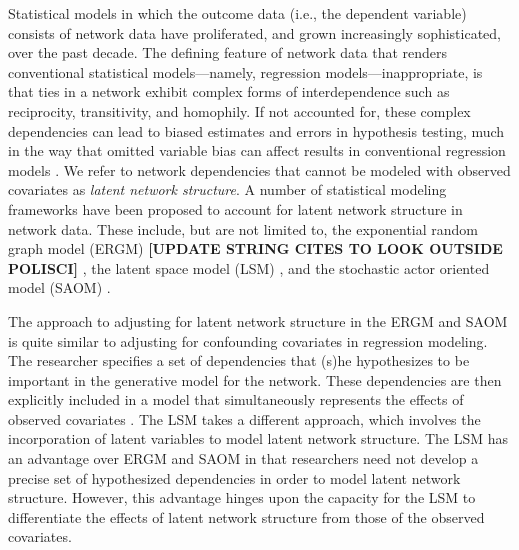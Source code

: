 \documentclass[11pt]{article}
\begin{document}
Statistical models in which the outcome data (i.e., the dependent variable) consists of network data have proliferated, and grown increasingly
sophisticated, over the past decade. The defining feature of network data that renders conventional statistical models---namely, regression models---inappropriate, is that ties in a network exhibit complex forms of interdependence such as reciprocity, transitivity, and
homophily. If not accounted for, these complex dependencies can lead to biased estimates and
errors in hypothesis testing, much in the way that omitted variable
bias can affect results in conventional regression models
\citep{ward2007disputes,kinne2014,cranmerisq,hays2010spatial}.  We refer to network dependencies that cannot be modeled with observed covariates as {\em latent network structure}. A
number of statistical modeling frameworks have been proposed to
account for latent network structure in network data. These include, but are not limited to, the exponential random
graph model (ERGM) {\bf [UPDATE STRING CITES TO LOOK OUTSIDE POLISCI]} \citep[e.g.,
][]{lazer2010,cranmer2011pa,desmarais2012psj}, the latent space model
(LSM) \citep[e.g.,
][]{ward2007disputes,ward2007persistent,kirkland2012multimember}, and
the stochastic actor oriented model (SAOM) \citep[e.g.,
][]{berardo2010ajps,kinne2014}.

The approach to adjusting for latent network structure in the ERGM and SAOM is
quite similar to adjusting for confounding covariates in regression
modeling. The researcher specifies a set of dependencies that (s)he
hypothesizes to be important in the generative model for the
network. These dependencies are then explicitly included in a model
that simultaneously represents the effects of observed covariates
\citep{cranmer2011pa}. The LSM takes a different approach, which
involves the incorporation of latent variables to model latent network structure. The LSM has an advantage over ERGM and SAOM in that
researchers need not develop a precise set of hypothesized dependencies in
order to model latent network structure. However, this advantage hinges upon the capacity for the
LSM to differentiate the effects of latent network structure 
from those of the observed covariates. 
\end{document}
